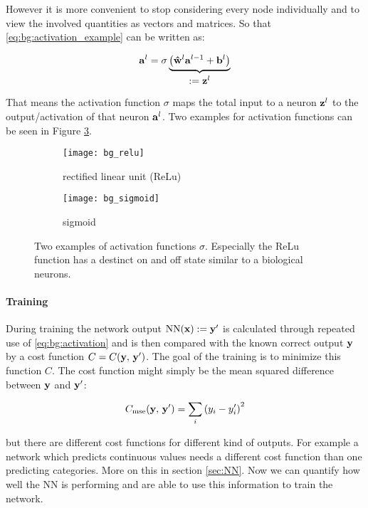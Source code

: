 \noindent
However it is more convenient to stop considering every node individually and to view the involved quantities as vectors and matrices. So that \eqref{eq:bg:activation_example} can be written as:

\begin{equation} \label{eq:bg:activation}
    \vb{a}^l = \sigma \underbrace{
    \qty(\vu{w}^l \vb{a}^{l-1} + \vb{b}^l)
    }_{
    \textstyle
    := \vb z^l
    }
\end{equation}

That means the activation function $\sigma$ maps the total input to a neuron $\vb z^l$ to the output/activation of that neuron $\vb a^l$. Two examples for activation functions can be seen in Figure \ref{fig:al:act}.

\begin{figure}[H]
\centering
\begin{subfigure}{.5\textwidth}
    \centering
    \texttt{[image: bg\_relu]}
    \caption{rectified linear unit (ReLu)}
    \label{}
\end{subfigure}%
\begin{subfigure}{.5\textwidth}
    \centering
    \texttt{[image: bg\_sigmoid]}
    \caption{sigmoid}
    \label{}
\end{subfigure}
\caption{Two examples of activation functions $\sigma$. Especially the ReLu function has a destinct on and off state similar to a biological neurons.}
\label{fig:al:act}
\end{figure}

\paragraph{Training} \label{par:training}
During training the network output $\mathrm{NN}(\vb x) := \vb{y}' $ is calculated through repeated use of \eqref{eq:bg:activation} and is then compared with the known correct output $\vb y$ by a cost function $C = C(\vb y, \, \vb y')$. The goal of the training is to minimize this function $C$. The cost function might simply be the mean squared difference between $\vb y$ and $\vb y'$:

\begin{equation}
    C_{\mathrm{mse}}(\vb y, \, \vb y') = \sum_i \qty(y_i - y_i')^2
\end{equation}

\noindent
but there are different cost functions for different kind of outputs. For example a network which predicts continuous values needs a different cost function than one predicting categories. More on this in section \ref{sec:NN}. Now we can quantify how well the NN is performing and are able to use this information to train the network.
\\

